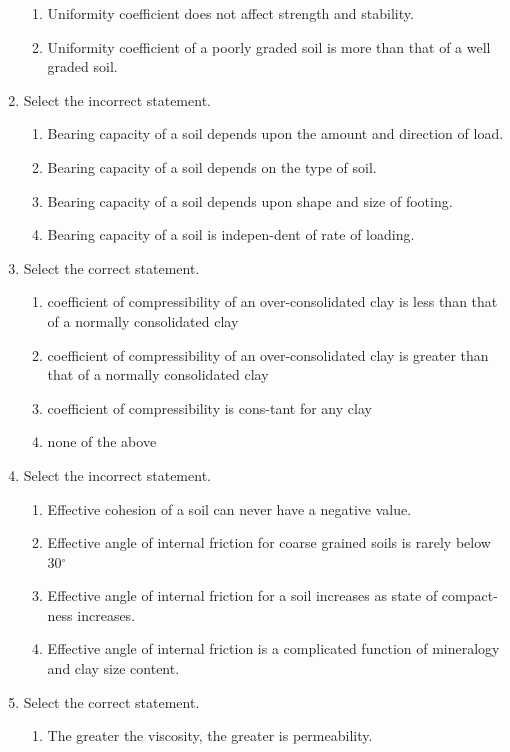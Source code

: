 \documentclass[11pt,a4paper]{article}
\begin{document}
\begin{enumerate}
\begin{enumerate}[label=\Alph*.]
\item{Uniformity coefficient does not affect strength and stability.}
\item{Uniformity coefficient of a poorly graded soil is more than that of a well graded soil.}
\end{enumerate}
\item{Select the incorrect statement.}
\begin{enumerate}[label=\Alph*.]
\item{Bearing capacity of a soil depends upon the amount and direction of load.}
\item{Bearing capacity of a soil depends on the type of soil.}
\item{Bearing capacity of a soil depends upon shape and size of footing.}
\item{Bearing capacity of a soil is indepen-dent of rate of loading.}
\end{enumerate}
\item{Select the correct statement.}
\begin{enumerate}[label=\Alph*.]
\item{coefficient of compressibility of an over-consolidated clay is less than that of a normally consolidated clay}
\item{coefficient of compressibility of an over-consolidated clay is greater than that of a normally consolidated clay}
\item{coefficient of compressibility is cons-tant for any clay}
\item{none of the above}
\end{enumerate}
\item{Select the incorrect statement.}
\begin{enumerate}[label=\Alph*.]
\item{Effective cohesion of a soil can never have a negative value.}
\item{Effective angle of internal friction for coarse grained soils is rarely below 30$^\circ$}
\item{Effective angle of internal friction for a soil increases as state of compact-ness increases.}
\item{Effective angle of internal friction is a complicated function of mineralogy and clay size content.}
\end{enumerate}
\item{Select the correct statement.}
\begin{enumerate}[label=\Alph*.]
\item{The greater the viscosity, the greater is permeability.}

\end{enumerate}
\end{enumerate}
\end{document}
